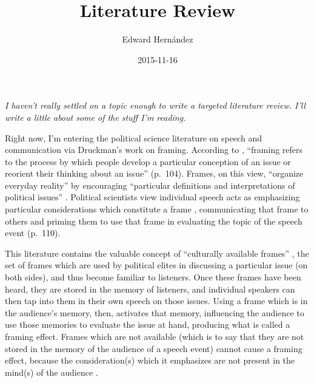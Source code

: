 \documentclass[man,12pt]{apa6}
\begin{document}
\title{Literature Review}
\author{Edward Hern\'{a}ndez}
\date{2015-11-16}
\maketitle

\noindent
\emph{
I haven't really settled on a topic enough to write a targeted literature
review. I'll write a little about some of the stuff I'm reading.
}

\vspace{12pt}

Right now, I'm entering the political science literature on speech and
communication via Druckman's work on framing. According to \citet{Chong07},
``framing refers to the process by which people develop a particular conception
of an issue or reorient their thinking about an issue'' (p.~104). Frames, on
this view, ``organize everyday reality'' \cite[p.~193]{Tuchman78} by
encouraging ``particular definitions and interpretations of political issues''
\cite[p.~343]{Shah02}. Political scientists view individual speech acts as
emphasizing particular considerations which constitute a frame
\cite[p~106]{Chong07}, communicating that frame to others and priming them to
use that frame in evaluating the topic of the speech event (p.~110).

This literature contains the valuable concept of ``culturally available
frames'' \cite[p.~144]{Gamson87}, the set of frames which are used by political
elites in discussing a particular issue (on both sides), and thus become
familiar to listeners. Once these frames have been heard, they are stored in
the memory of listeners, and individual speakers can then tap into them in
their own speech on those issues.
%
%
Using a frame which is in the audience's memory, then, activates that memory,
influencing the audience to use those memories to evaluate the issue at hand,
producing what is called a framing effect. Frames which are not available
(which is to say that they are not stored in the memory of the audience of a
speech event) cannot cause a framing effect, because the consideration(s) which
it emphasizes are not present in the mind(s) of the audience
\cite[p.~110]{Chong07}.
\end{document}
